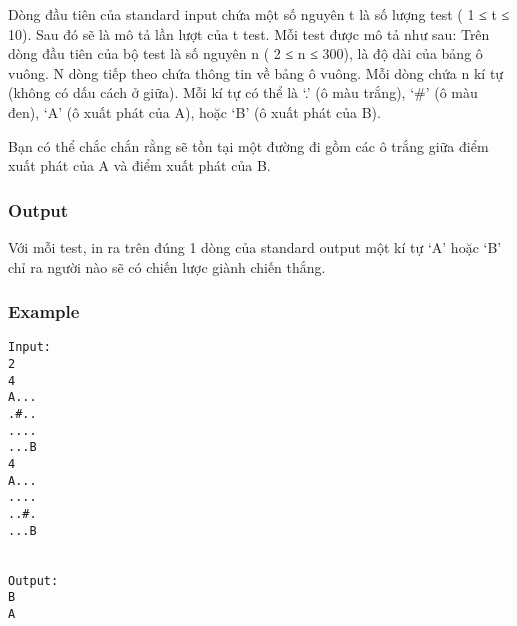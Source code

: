    Dòng đầu tiên của standard input chứa một số nguyên t là số lượng test ( 1 ≤ t ≤ 10). Sau đó sẽ là mô tả lần lượt của t test. Mỗi test được mô tả như sau: Trên dòng đầu tiên của bộ test là số nguyên n ( 2 ≤ n ≤ 300), là độ dài của bảng ô vuông. N dòng tiếp theo chứa thông tin về bảng ô vuông. Mỗi dòng chứa n kí tự (không có dấu cách ở giữa). Mỗi kí tự có thể là ‘.’ (ô màu trắng), ‘\#’ (ô màu đen), ‘A’ (ô xuất phát của A), hoặc ‘B’ (ô xuất phát của B).  

   Bạn có thể chắc chắn rằng sẽ tồn tại một đường đi gồm các ô trắng giữa điểm xuất phát của A và điểm xuất phát của B.  

\subsubsection{   Output  }

   Với mỗi test, in ra trên đúng 1 dòng của standard output một kí tự ‘A’ hoặc ‘B’ chỉ ra người nào sẽ có chiến lược giành chiến thắng.  

\subsubsection{   Example  }
\begin{verbatim}
Input:
2
4
A...
.#..
....
...B
4
A...
....
..#.
...B


Output:
B
A

\end{verbatim}